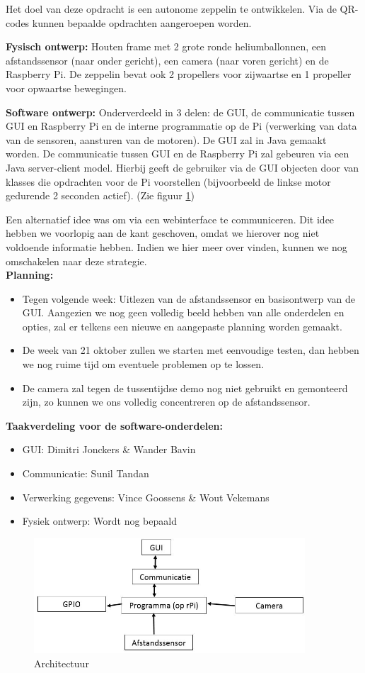 \documentclass{peno-opdracht1}
\begin{document}
\maketitle

Het doel van deze opdracht is een autonome zeppelin te ontwikkelen. Via de QR-codes kunnen bepaalde opdrachten aangeroepen worden.

\textbf{Fysisch ontwerp:} Houten frame met 2 grote ronde heliumballonnen, een afstandssensor (naar onder gericht), een camera (naar voren gericht) en de Raspberry Pi. De zeppelin bevat ook 2 propellers voor zijwaartse en 1 propeller voor opwaartse bewegingen.

\textbf{Software ontwerp:} Onderverdeeld in 3 delen: de GUI, de communicatie tussen GUI en Raspberry Pi en de interne programmatie op de Pi (verwerking van data van de sensoren, aansturen van de motoren).
De GUI zal in Java gemaakt worden. De communicatie tussen GUI en de Raspberry Pi zal gebeuren via een Java server-client model. Hierbij geeft de gebruiker via de GUI objecten door van klasses die opdrachten voor de Pi voorstellen (bijvoorbeeld de linkse motor gedurende 2 seconden actief). (Zie figuur \ref{schema})

Een alternatief idee was om via een webinterface te communiceren. Dit idee hebben we voorlopig aan de kant geschoven, omdat we hierover nog niet voldoende informatie hebben. Indien we hier meer over vinden, kunnen we nog omschakelen naar deze strategie.\\

\textbf{Planning:}
\begin{itemize}
\item Tegen volgende week: Uitlezen van de afstandssensor en basisontwerp van de GUI. Aangezien we nog geen volledig beeld hebben van alle onderdelen en opties, zal er telkens een nieuwe en aangepaste planning worden gemaakt.
\item De week van 21 oktober zullen we starten met eenvoudige testen, dan hebben we nog ruime tijd om eventuele problemen op te lossen.
\item De camera zal tegen de tussentijdse demo nog niet gebruikt en gemonteerd zijn, zo kunnen we ons volledig concentreren op de afstandssensor.
\end{itemize}


\textbf{Taakverdeling voor de software-onderdelen:}
\begin{itemize}
\item GUI: Dimitri Jonckers \& Wander Bavin
\item Communicatie: Sunil Tandan
\item Verwerking gegevens: Vince Goossens \& Wout Vekemans
\item Fysiek ontwerp: Wordt nog bepaald
\end{itemize}

\begin{figure}[ht!]
\centering
\includegraphics[height=43mm]{Schema.jpg}
\caption{Architectuur}
\label{schema}
\end{figure}
\end{document}
